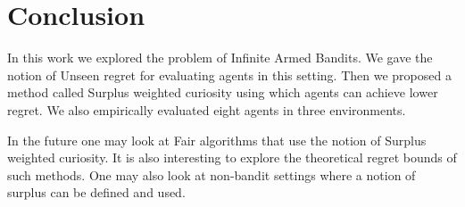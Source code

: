 \section{Conclusion}

In this work we explored the problem of Infinite Armed Bandits. We gave the notion of Unseen regret for evaluating agents in this setting. Then we proposed a method called Surplus weighted curiosity using which agents can achieve lower regret. We also empirically evaluated eight agents in three environments.

In the future one may look at Fair algorithms that use the notion of Surplus weighted curiosity. It is also interesting to explore the theoretical regret bounds of such methods. One may also look at non-bandit settings where a notion of surplus can be defined and used.